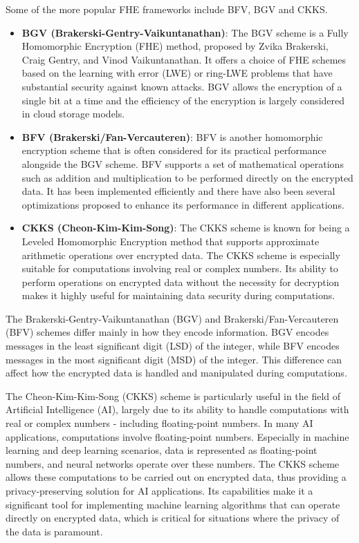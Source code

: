\documentclass[11pt]{article}
\begin{document}
Some of the more popular FHE frameworks include BFV, BGV and CKKS.
\begin{itemize}
	\item \textbf{BGV (Brakerski-Gentry-Vaikuntanathan)}: The BGV scheme is a Fully Homomorphic Encryption (FHE) method, proposed by Zvika Brakerski, Craig Gentry, and Vinod Vaikuntanathan. It offers a choice of FHE schemes based on the learning with error (LWE) or ring-LWE problems that have substantial security against known attacks. BGV allows the encryption of a single bit at a time and the efficiency of the encryption is largely considered in cloud storage models.
	\item \textbf{BFV (Brakerski/Fan-Vercauteren)}: BFV is another homomorphic encryption scheme that is often considered for its practical performance alongside the BGV scheme. BFV supports a set of mathematical operations such as addition and multiplication to be performed directly on the encrypted data. It has been implemented efficiently and there have also been several optimizations proposed to enhance its performance in different applications.
	\item \textbf{CKKS (Cheon-Kim-Kim-Song)}: The CKKS scheme is known for being a Leveled Homomorphic Encryption method that supports approximate arithmetic operations over encrypted data. The CKKS scheme is especially suitable for computations involving real or complex numbers. Its ability to perform operations on encrypted data without the necessity for decryption makes it highly useful for maintaining data security during computations.
\end{itemize}
The Brakerski-Gentry-Vaikuntanathan (BGV) and Brakerski/Fan-Vercauteren (BFV) schemes differ mainly in how they encode information. BGV encodes messages in the least significant digit (LSD) of the integer, while BFV encodes messages in the most significant digit (MSD) of the integer. This difference can affect how the encrypted data is handled and manipulated during computations.

The Cheon-Kim-Kim-Song (CKKS) scheme is particularly useful in the field of Artificial Intelligence (AI), largely due to its ability to handle computations with real or complex numbers - including floating-point numbers.
In many AI applications, computations involve floating-point numbers. Especially in machine learning and deep learning scenarios, data is represented as floating-point numbers, and neural networks operate over these numbers. The CKKS scheme allows these computations to be carried out on encrypted data, thus providing a privacy-preserving solution for AI applications.
Its capabilities make it a significant tool for implementing machine learning algorithms that can operate directly on encrypted data, which is critical for situations where the privacy of the data is paramount.
\end{document}
